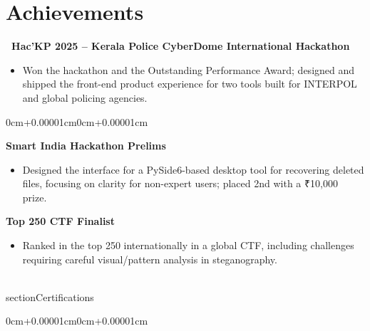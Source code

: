 \documentclass[10pt, a4paper]{article}
\newenvironment{highlights}{
    \begin{itemize}[
        topsep=0.03cm, parsep=0.03cm, partopsep=0pt,
        itemsep=0pt, leftmargin=11pt
    ]
}{
    \end{itemize}
}
\newenvironment{onecolentry}{
    \begin{adjustwidth}{0cm+0.00001cm}{0cm+0.00001cm}
}{
    \end{adjustwidth}
}
\begin{document}
\section{Achievements}

\begin{spotlight}
    \textbf{\faTrophy\ Hac'KP 2025 -- Kerala Police CyberDome International Hackathon}
    \begin{highlights}
        \item Won the hackathon and the Outstanding Performance Award; designed and shipped the front-end product experience for two tools built for INTERPOL and global policing agencies.
    \end{highlights}
\end{spotlight}

\begin{onecolentry}
    \textbf{Smart India Hackathon Prelims}
    \begin{highlights}
        \item Designed the interface for a PySide6-based desktop tool for recovering deleted files, focusing on clarity for non-expert users; placed 2nd with a \textrm{₹}10,000 prize.
    \end{highlights}

    \textbf{Top 250 CTF Finalist}
    \begin{highlights}
        \item Ranked in the top 250 internationally in a global CTF, including challenges requiring careful visual/pattern analysis in steganography.
    \end{highlights}
\end{onecolentry}

\\section{Certifications}
\begin{onecolentry}
\end{onecolentry}
\end{document}
